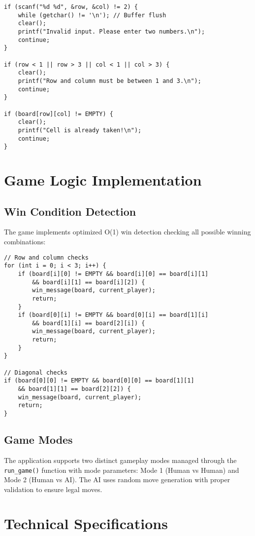 \documentclass[12pt]{article}
\begin{document}
\begin{lstlisting}[caption=Robust Input Validation]
if (scanf("%d %d", &row, &col) != 2) {
    while (getchar() != '\n'); // Buffer flush
    clear();
    printf("Invalid input. Please enter two numbers.\n");
    continue;
}

if (row < 1 || row > 3 || col < 1 || col > 3) {
    clear();
    printf("Row and column must be between 1 and 3.\n");
    continue;
}

if (board[row][col] != EMPTY) {
    clear();
    printf("Cell is already taken!\n");
    continue;
}
\end{lstlisting}

\section{Game Logic Implementation}

\subsection{Win Condition Detection}
The game implements optimized O(1) win detection checking all possible winning combinations:

\begin{lstlisting}[caption=Win Detection Algorithm]
// Row and column checks
for (int i = 0; i < 3; i++) {
    if (board[i][0] != EMPTY && board[i][0] == board[i][1] 
        && board[i][1] == board[i][2]) {
        win_message(board, current_player);
        return;
    }
    if (board[0][i] != EMPTY && board[0][i] == board[1][i] 
        && board[1][i] == board[2][i]) {
        win_message(board, current_player);
        return;
    }
}

// Diagonal checks
if (board[0][0] != EMPTY && board[0][0] == board[1][1] 
    && board[1][1] == board[2][2]) {
    win_message(board, current_player);
    return;
}
\end{lstlisting}

\subsection{Game Modes}
The application supports two distinct gameplay modes managed through the \texttt{run\_game()} function with mode parameters: Mode 1 (Human vs Human) and Mode 2 (Human vs AI). The AI uses random move generation with proper validation to ensure legal moves.

\section{Technical Specifications}
\end{document}
